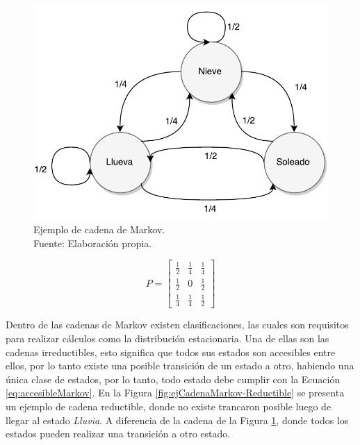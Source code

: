 \begin{figure}[ht!]
	\centering
	\includegraphics[scale=0.5]{images/EjCadenaMarkov.pdf}
	\caption[Ejemplo de cadena de Markov.]{Ejemplo de cadena de Markov.\\Fuente: Elaboraci\'on propia.}
	\label{fig:ejCadenaMarkov}
\end{figure}

\begin{equation} \label{eq:ejCadenaMarkov}
	P =
	\begin{bmatrix}
		\frac{1}{2} & \frac{1}{4} & \frac{1}{4} \\
		\frac{1}{2} & 0 & \frac{1}{2} \\
		\frac{1}{4} & \frac{1}{4} & \frac{1}{2}
	\end{bmatrix}	
\end{equation}

\normalsize{Dentro de las cadenas de Markov existen clasificaciones, las cuales son requisitos para realizar c\'alculos como la distribuci\'on estacionaria. Una de ellas son las cadenas irreductibles, esto significa que todos sus estados son accesibles entre ellos, por lo tanto existe una posible transici\'on de un estado a otro, habiendo una \'unica clase de estados, por lo tanto, todo estado debe cumplir con la Ecuaci\'on} \ref{eq:accesibleMarkov}. \normalsize{En la Figura} \ref{fig:ejCadenaMarkov-Reductible} \normalsize{se presenta un ejemplo de cadena reductible, donde no existe trancaron posible luego de llegar al estado \textit{Lluvia}. A diferencia de la cadena de la Figura} \ref{fig:ejCadenaMarkov}, \normalsize{donde todos los estados pueden realizar una transici\'on a otro estado.}

